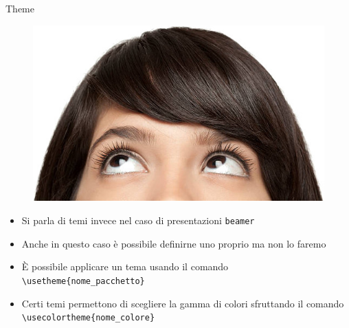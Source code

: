 \begin{frame}{Theme}

\begin{figure}
	\centering
	\includegraphics[scale=0.20]{res/images/temi}
\end{figure}

\begin{itemize}
	\item Si parla di temi invece nel caso di presentazioni \texttt{beamer}
	\item Anche in questo caso è possibile definirne uno proprio ma non lo
	faremo
	\item È possibile applicare un tema usando il comando
	\texttt{\textbackslash{}usetheme\{nome\_pacchetto\}}
	\item Certi temi permettono di scegliere la gamma di colori sfruttando il
	comando \texttt{\textbackslash{}usecolortheme\{nome\_colore\}}
\end{itemize}

\end{frame}
